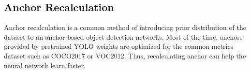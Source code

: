   


  \subsection{Anchor Recalculation}
  \label{section:anchor_recalc_study}
  Anchor recalculation is a common method of introducing prior distribution of the dataset to an anchor-based object
  detection networks. Most of the time, anchors provided by pretrained YOLO weights are optimized for the common metrics
  dataset such as COCO2017 or VOC2012. Thus, recalculating anchor can help the neural network learn faster.

